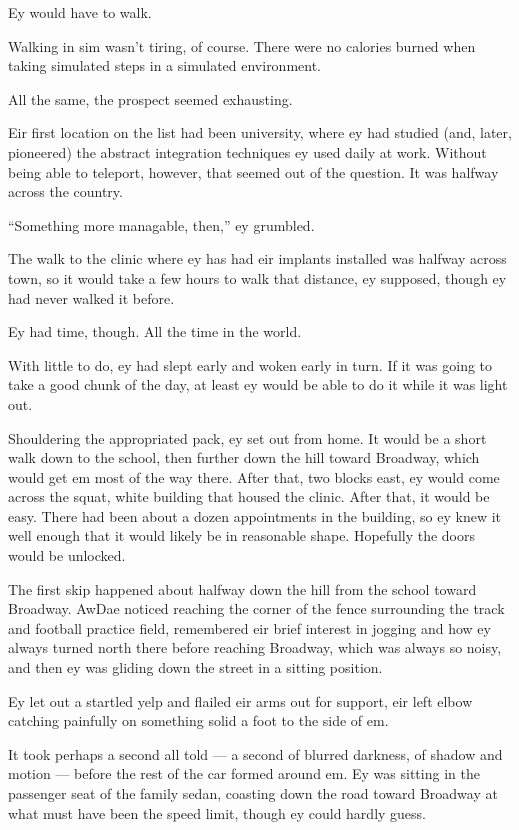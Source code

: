 Ey would have to walk.

Walking in sim wasn't tiring, of course. There were no calories burned when taking simulated steps in a simulated environment.

All the same, the prospect seemed exhausting.

Eir first location on the list had been university, where ey had studied (and, later, pioneered) the abstract integration techniques ey used daily at work. Without being able to teleport, however, that seemed out of the question. It was halfway across the country.

``Something more managable, then,'' ey grumbled.

The walk to the clinic where ey has had eir implants installed was halfway across town, so it would take a few hours to walk that distance, ey supposed, though ey had never walked it before.

Ey had time, though. All the time in the world.

With little to do, ey had slept early and woken early in turn. If it was going to take a good chunk of the day, at least ey would be able to do it while it was light out.

Shouldering the appropriated pack, ey set out from home. It would be a short walk down to the school, then further down the hill toward Broadway, which would get em most of the way there. After that, two blocks east, ey would come across the squat, white building that housed the clinic. After that, it would be easy. There had been about a dozen appointments in the building, so ey knew it well enough that it would likely be in reasonable shape. Hopefully the doors would be unlocked.

The first skip happened about halfway down the hill from the school toward Broadway. AwDae noticed reaching the corner of the fence surrounding the track and football practice field, remembered eir brief interest in jogging and how ey always turned north there before reaching Broadway, which was always so noisy, and then ey was gliding down the street in a sitting position.

Ey let out a startled yelp and flailed eir arms out for support, eir left elbow catching painfully on something solid a foot to the side of em.

It took perhaps a second all told --- a second of blurred darkness, of shadow and motion --- before the rest of the car formed around em. Ey was sitting in the passenger seat of the family sedan, coasting down the road toward Broadway at what must have been the speed limit, though ey could hardly guess.


